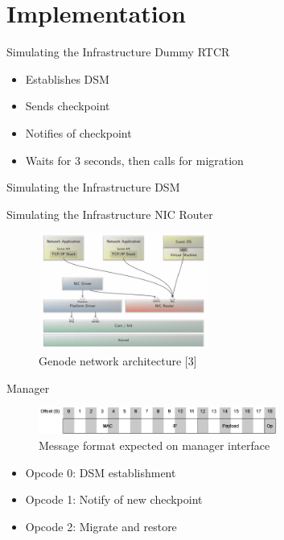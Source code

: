 \documentclass[
  english,            %
  aspectratio=169,    %
]{tumbeamer}
\begin{document}
\section{Implementation}
\begin{frame}{Simulating the Infrastructure}
Dummy RTCR
\newline
\begin{itemize}
    \item Establishes DSM
    \item Sends checkpoint
    \item Notifies of checkpoint
    \item Waits for 3 seconds, then calls for migration
\end{itemize}
\end{frame}

\begin{frame}{Simulating the Infrastructure}
DSM
\end{frame}

\begin{frame}{Simulating the Infrastructure}
NIC Router
\begin{figure}
    \centering
    \includegraphics[width=0.5\textwidth]{network_architecture.png}
    \caption{Genode network architecture [3]}
    \label{fig:router}
\end{figure}
\end{frame}

\begin{frame}{Manager}
\hfill
\begin{figure}
    \centering
    \includegraphics[width=0.7\textwidth]{main_message_format.png}
    \caption{Message format expected on manager interface}
    \label{fig:router}
\end{figure}
\begin{itemize}
    \item Opcode 0: DSM establishment
    \item Opcode 1: Notify of new checkpoint
    \item Opcode 2: Migrate and restore
\end{itemize}
\end{frame}
\end{document}
